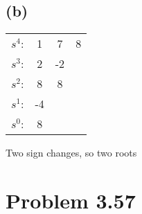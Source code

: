 \documentclass[12pt]{article}
\begin{document}
\subsection*{(b)}
\begin{center}
    \begin{tabular}{ c c c c} 
     $s^4$: & 1 & 7 & 8\\ 
     $s^3$: & 2 & -2&  \\ 
     $s^2$: & 8 & 8&\\
     $s^1$:  & -4 & &\\
     $s^0$: & 8 & &
\end{tabular} 
\end{center}
Two sign changes, so two roots
\section*{Problem 3.57}

    
\end{document}

